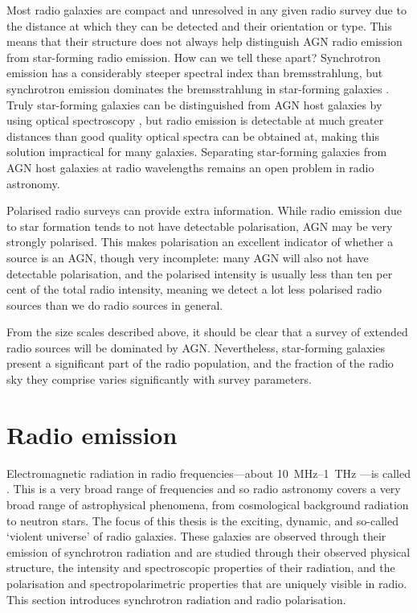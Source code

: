     Most radio galaxies are compact and unresolved in any given radio survey due to the distance at which they can be detected and their orientation or type. This means that their structure does not always help distinguish AGN radio emission from star-forming radio emission. How can we tell these apart? Synchrotron emission has a considerably steeper spectral index than bremsstrahlung, but synchrotron emission dominates the bremsstrahlung in star-forming galaxies \citep{condon_radio_1992}. Truly star-forming galaxies can be distinguished from AGN host galaxies by using optical spectroscopy \citep[e.g.][]{mauch_radio_2007, groves_distinguishing_2008}, but radio emission is detectable at much greater distances than good quality optical spectra can be obtained at, making this solution impractical for many galaxies. Separating star-forming galaxies from AGN host galaxies at radio wavelengths remains an open problem in radio astronomy. 

    Polarised radio surveys can provide extra information. While radio emission due to star formation tends to not have detectable polarisation, AGN may be very strongly polarised. This makes polarisation an excellent indicator of whether a source is an AGN, though very incomplete: many AGN will also not have detectable polarisation, and the polarised intensity is usually less than ten per cent of the total radio intensity, meaning we detect a lot less polarised radio sources than we do radio sources in general.

    From the size scales described above, it should be clear that a survey of extended radio sources will be dominated by AGN. Nevertheless, star-forming galaxies present a significant part of the radio population, and the fraction of the radio sky they comprise varies significantly with survey parameters.

\section{Radio emission}
\label{sec:radio-astronomy}

    Electromagnetic radiation in radio frequencies---about 10~MHz--1~THz \citep{condon_essential_2016}---is called . This is a very broad range of frequencies and so radio astronomy covers a very broad range of astrophysical phenomena, from cosmological background radiation to neutron stars. The focus of this thesis is the exciting, dynamic, and so-called `violent universe' of radio galaxies. These galaxies are observed through their emission of synchrotron radiation and are studied through their observed physical structure, the intensity and spectroscopic properties of their radiation, and the polarisation and spectropolarimetric properties that are uniquely visible in radio. This section introduces synchrotron radiation and radio polarisation.

